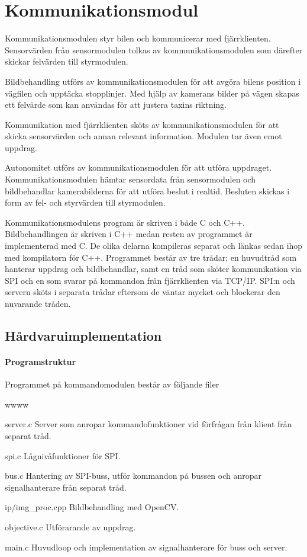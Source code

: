 \documentclass[tekniskrapport/tech.tex]{subfiles}
\begin{document}
\section{Kommunikationsmodul}
Kommunikationsmodulen styr bilen och kommunicerar med fjärrklienten.
Sensorvärden från sensormodulen tolkas av kommunikationsmodulen som därefter
skickar felvärden till styrmodulen.

Bildbehandling utförs av kommunikationsmodulen för att
avgöra bilens position i vägfilen och upptäcka stopplinjer. Med hjälp av
kamerans bilder på vägen skapas ett felvärde som kan användas för att justera
taxins riktning.

Kommunikation med fjärrklienten sköts av kommunikationsmodulen för
att skicka sensorvärden och annan relevant information. Modulen tar
även emot uppdrag.

Autonomitet utförs av kommunikationsmodulen för att utföra uppdraget.
Kommunikationsmodulen hämtar sensordata från sensormodulen och bildbehandlar
kamerabilderna för att utföra beslut i realtid. Besluten skickas i form av fel-
och styrvärden till styrmodulen.

Kommunikationsmodulens program är skriven i både C och C++. Bildbehandlingen är
skriven i C++ medan resten av programmet är implementerad med C. De olika
delarna kompileras separat och länkas sedan ihop med kompilatorn för C++.
Programmet består av tre trådar; en huvudtråd som hanterar uppdrag och
bildbehandlar, samt en tråd som sköter kommunikation via SPI och en som svarar
på kommandon från fjärrklienten via TCP/IP. SPI:n och servern sköts i separata
trådar eftersom de väntar mycket och blockerar den nuvarande tråden.


\subsection{Hårdvaruimplementation} 

\paragraph{Programstruktur}
Programmet på kommandomodulen består av följande filer

\begin{labeling}{wwww}
    \item[server.c] Server som anropar kommandofunktioner vid förfrågan från
        klient från separat tråd.
	\item[spi.c] Lågnivåfunktioner för SPI.
    \item[bus.c] Hantering av SPI-buss, utför kommandon på bussen och anropar
        signalhanterare från separat tråd.
    \item[ip/img\_proc.cpp] Bildbehandling med OpenCV.
    \item[objective.c] Utförarande av uppdrag.
    \item[main.c] Huvudloop och implementation av signalhanterare för buss och
        server.
\end{labeling}
\end{document}
